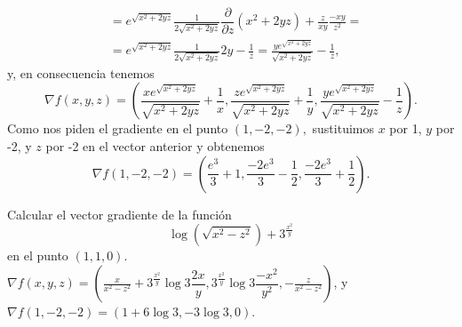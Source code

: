 {\begin{align*}
&= e^{\sqrt{x^2+2yz}}\frac{1}{2\sqrt{x^2+2yz}}\dfrac{\partial}{\partial z}(x^2+2yz)+\frac{z}{xy}\frac{-xy}{z^2}= \\
&= e^{\sqrt{x^2+2yz}}\frac{1}{2\sqrt{x^2+2yz}}2y-\frac{1}{z} = \frac{ye^{\sqrt{x^2+2yz}}}{\sqrt{x^2+2yz}}-\frac{1}{z},
\end{align*}
y, en consecuencia tenemos 
\[
\nabla f(x,y,z)=\left(\frac{xe^{\sqrt{x^2+2yz}}}{\sqrt{x^2+2yz}}+\frac{1}{x}, \frac{ze^{\sqrt{x^2+2yz}}}{\sqrt{x^2+2yz}}+\frac{1}{y}, \frac{ye^{\sqrt{x^2+2yz}}}{\sqrt{x^2+2yz}}-\frac{1}{z}\right).
\]
Como nos piden el gradiente en el punto $(1,-2,-2),$ sustituimos $x$ por 1, $y$ por -2, y $z$ por -2 en el vector anterior y obtenemos 
\[
\nabla f(1,-2,-2)=\left(\frac{e^3}{3}+1,\frac{-2e^3}{3}-\frac{1}{2},\frac{-2e^3}{3}+\frac{1}{2}\right).
\]
}


{Calcular el vector gradiente de la función
\[
\log \left( \sqrt{x^{2}-z^{2}}\right) +3^{\tfrac{x^{2}}{y}}
\]
en el punto $(1,1,0)$.
}
{$\nabla f(x,y,z)=(\frac{x}{x^{2}-z^{2}}+3^{\tfrac{x^{2}}{y}}\log 3\dfrac{2x}{y},3^{\tfrac{x^{2}}{y}}\log 3\dfrac{-x^{2}}{y^{2}},-\frac{z}{x^{2}-z^{2}})$, y $\nabla f(1,-2,-2)=(1+6\log 3,-3\log 3,0)$.
}
